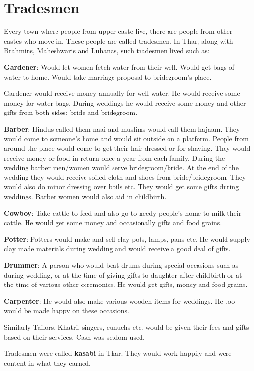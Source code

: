 \chapter{Tradesmen}
Every town where people from upper caste live, there are people from other
castes who move in. These people are called tradesmen. In Thar, along with
Brahmins, Maheshwaris and Luhanas, such tradesmen lived such as:

\textbf{Gardener}: Would let women fetch water from their well. Would get bags
of water to home. Would take marriage proposal to bridegroom's place.

Gardener would receive money annually for well water. He would receive some
money for water bags. During weddings he would receive some money and other
gifts from both sides: bride and bridegroom.

\textbf{Barber}: Hindus called them naai and muslims would call them hajaam.
They would come to someone's home and would sit outside on a platform. People
from around the place would come to get their hair dressed or for shaving. They
would receive money or food in return once a year from each family. During the
wedding barber men/women would serve bridegroom/bride. At the end of the wedding
they would receive soiled cloth and shoes from bride/bridegroom. They would also do
minor dressing over boils etc. They would get some gifts during weddings.
Barber women would also aid in childbirth.

\textbf{Cowboy}: Take cattle to feed and also go to needy people's home to milk
their cattle. He would get some money and occasionally gifts and food grains.

\textbf{Potter}: Potters would make and sell clay pots, lamps, pans etc. He
would supply clay made materials during wedding and would receive a good deal
of gifts.

\textbf{Drummer}: A person who would beat drums during special occasions such
as during wedding, or at the time of giving gifts to daughter after childbirth
or at the time of various other ceremonies. He would get gifts, money and food
grains.

\textbf{Carpenter}: He would also make various wooden items for weddings. He
too would be made happy on these occasions.

Similarly Tailors, Khatri, singers, eunuchs etc. would be given their fees and
gifts based on their services. Cash was seldom used.

Tradesmen were called \textbf{kasabi} in Thar. They would work happily and were
content in what they earned.

